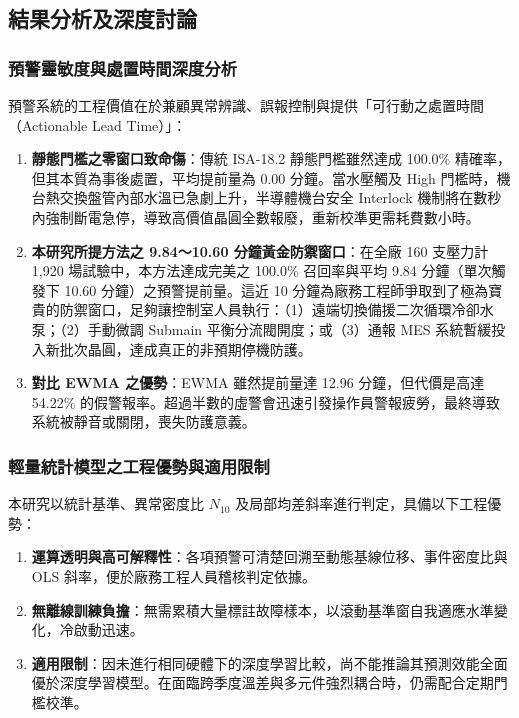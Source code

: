 \documentclass[fontset=none, a4paper, 12pt]{ctexart}
\begin{document}
\subsection{結果分析及深度討論}

\subsubsection{預警靈敏度與處置時間深度分析}
預警系統的工程價值在於兼顧異常辨識、誤報控制與提供「可行動之處置時間（Actionable Lead Time）」：
\begin{enumerate}
    \item \textbf{靜態門檻之零窗口致命傷}：傳統 ISA-18.2 靜態門檻雖然達成 100.0\% 精確率，但其本質為事後處置，平均提前量為 0.00 分鐘。當水壓觸及 High 門檻時，機台熱交換盤管內部水溫已急劇上升，半導體機台安全 Interlock 機制將在數秒內強制斷電急停，導致高價值晶圓全數報廢，重新校準更需耗費數小時。
    \item \textbf{本研究所提方法之 9.84～10.60 分鐘黃金防禦窗口}：在全廠 160 支壓力計 1,920 場試驗中，本方法達成完美之 100.0\% 召回率與平均 9.84 分鐘（單次觸發下 10.60 分鐘）之預警提前量。這近 10 分鐘為廠務工程師爭取到了極為寶貴的防禦窗口，足夠讓控制室人員執行：（1）遠端切換備援二次循環冷卻水泵；（2）手動微調 Submain 平衡分流閥開度；或（3）通報 MES 系統暫緩投入新批次晶圓，達成真正的非預期停機防護。
    \item \textbf{對比 EWMA 之優勢}：EWMA 雖然提前量達 12.96 分鐘，但代價是高達 54.22\% 的假警報率。超過半數的虛警會迅速引發操作員警報疲勞，最終導致系統被靜音或關閉，喪失防護意義。
\end{enumerate}

\subsubsection{輕量統計模型之工程優勢與適用限制}
本研究以統計基準、異常密度比 $N_{10}$ 及局部均差斜率進行判定，具備以下工程優勢：
\begin{enumerate}
    \item \textbf{運算透明與高可解釋性}：各項預警可清楚回溯至動態基線位移、事件密度比與 OLS 斜率，便於廠務工程人員稽核判定依據。
    \item \textbf{無離線訓練負擔}：無需累積大量標註故障樣本，以滾動基準窗自我適應水準變化，冷啟動迅速。
    \item \textbf{適用限制}：因未進行相同硬體下的深度學習比較，尚不能推論其預測效能全面優於深度學習模型。在面臨跨季度溫差與多元件強烈耦合時，仍需配合定期門檻校準。
\end{enumerate}
\end{document}
